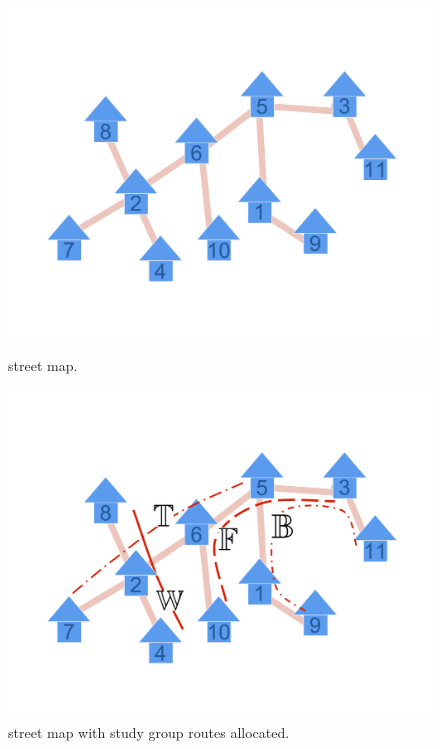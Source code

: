 \begin{figure}[htbp] %
  \centering
  \vspace{-10mm}
  \includegraphics[scale=0.45]{../img/1_infinite_loop__cropped.pdf}
  \caption{\figtabsize {\residenceblock} street map.}
  \label{fig:streetmap}

  \includegraphics[scale=0.45]{../img/2_infinite_loop_BTWF__cropped.pdf}
  \caption[\figtabsize \residenceblock street map with study group
    routes allocated.]{\figtabsize {\residenceblock} street map with study group
    routes allocated. %
  }
  \label{fig:streetmappath}


\end{figure}
